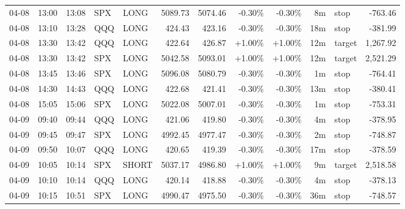 \documentclass[11pt,a4paper,twoside]{article}
\begin{document}
\begin{center}
\begin{longtable}{>{\color{txtmain}}l l l l l r r r r r >{\color{txtmain}}l r}
04-08 & 13:00 & 13:08 & SPX & LONG & 5089.73 & 5074.46 & \textcolor{lossred}{-0.30\%} & \textcolor{lossred}{-0.30\%} & 8m & stop & \textcolor{lossred}{-763.46} \\
04-08 & 13:10 & 13:28 & QQQ & LONG & 424.43 & 423.16 & \textcolor{lossred}{-0.30\%} & \textcolor{lossred}{-0.30\%} & 18m & stop & \textcolor{lossred}{-381.99} \\
04-08 & 13:30 & 13:42 & QQQ & LONG & 422.64 & 426.87 & \textcolor{wingreen}{+1.00\%} & \textcolor{wingreen}{+1.00\%} & 12m & target & \textcolor{wingreen}{1,267.92} \\
04-08 & 13:30 & 13:42 & SPX & LONG & 5042.58 & 5093.01 & \textcolor{wingreen}{+1.00\%} & \textcolor{wingreen}{+1.00\%} & 12m & target & \textcolor{wingreen}{2,521.29} \\
04-08 & 13:45 & 13:46 & SPX & LONG & 5096.08 & 5080.79 & \textcolor{lossred}{-0.30\%} & \textcolor{lossred}{-0.30\%} & 1m & stop & \textcolor{lossred}{-764.41} \\
04-08 & 14:30 & 14:43 & QQQ & LONG & 422.68 & 421.41 & \textcolor{lossred}{-0.30\%} & \textcolor{lossred}{-0.30\%} & 13m & stop & \textcolor{lossred}{-380.41} \\
04-08 & 15:05 & 15:06 & SPX & LONG & 5022.08 & 5007.01 & \textcolor{lossred}{-0.30\%} & \textcolor{lossred}{-0.30\%} & 1m & stop & \textcolor{lossred}{-753.31} \\
04-09 & 09:40 & 09:44 & QQQ & LONG & 421.06 & 419.80 & \textcolor{lossred}{-0.30\%} & \textcolor{lossred}{-0.30\%} & 4m & stop & \textcolor{lossred}{-378.95} \\
04-09 & 09:45 & 09:47 & SPX & LONG & 4992.45 & 4977.47 & \textcolor{lossred}{-0.30\%} & \textcolor{lossred}{-0.30\%} & 2m & stop & \textcolor{lossred}{-748.87} \\
04-09 & 09:50 & 10:07 & QQQ & LONG & 420.65 & 419.39 & \textcolor{lossred}{-0.30\%} & \textcolor{lossred}{-0.30\%} & 17m & stop & \textcolor{lossred}{-378.59} \\
04-09 & 10:05 & 10:14 & SPX & SHORT & 5037.17 & 4986.80 & \textcolor{wingreen}{+1.00\%} & \textcolor{wingreen}{+1.00\%} & 9m & target & \textcolor{wingreen}{2,518.58} \\
04-09 & 10:10 & 10:14 & QQQ & LONG & 420.14 & 418.88 & \textcolor{lossred}{-0.30\%} & \textcolor{lossred}{-0.30\%} & 4m & stop & \textcolor{lossred}{-378.13} \\
04-09 & 10:15 & 10:51 & SPX & LONG & 4990.47 & 4975.50 & \textcolor{lossred}{-0.30\%} & \textcolor{lossred}{-0.30\%} & 36m & stop & \textcolor{lossred}{-748.57} \\

\end{longtable}
\end{center}
\end{document}
